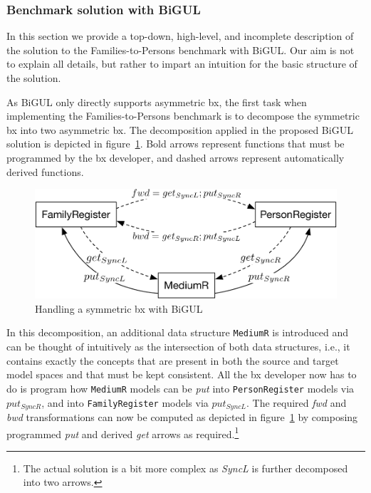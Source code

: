 \subsubsection{Benchmark solution with BiGUL}

In this section we provide a top-down, high-level, and incomplete description of the solution to the Families-to-Persons benchmark with BiGUL.
Our aim is not to explain all details, but rather to impart an intuition for the basic structure of the solution.

As BiGUL only directly supports asymmetric bx, the first task when implementing the Families-to-Persons benchmark is to decompose the symmetric bx into two asymmetric bx.
The decomposition applied in the proposed BiGUL solution is depicted in figure~\ref{fig:bigulSolnOverview}.
Bold arrows represent functions that must be programmed by the bx developer, and dashed arrows represent automatically derived functions.
%
\begin{figure}[!tbp]
    \centering
    \includegraphics[width=\columnwidth]{diagrams/solutions/bigulSolnOverview}
    \caption{Handling a symmetric bx with BiGUL}
    \label{fig:bigulSolnOverview}
\end{figure}
%
In this decomposition, an additional data structure \texttt{MediumR} is introduced and can be thought of intuitively as the intersection of both data structures, i.e., it contains exactly the concepts that are present in both the source and target model spaces and that must be kept consistent.
All the bx developer now has to do is program how \texttt{MediumR} models can be \emph{put} into \texttt{Person\-Regis\-ter} models via $put_{SyncR}$, and into \texttt{Family\-Regis\-ter} models via $put_{SyncL}$.
The required \emph{fwd} and \emph{bwd} transformations can now be computed as depicted in figure~\ref{fig:bigulSolnOverview} by composing programmed \emph{put} and derived \emph{get} arrows as required.\footnote{The actual solution is a bit more complex as \emph{SyncL} is further decomposed into two arrows.}

